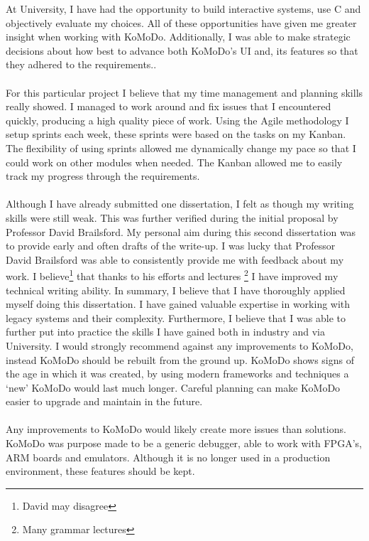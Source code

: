 %
At University, I have had the opportunity to build interactive systems, use C and objectively evaluate my choices. All of these opportunities have given me greater insight when working with KoMoDo. Additionally, I was able to make strategic decisions about how best to advance both KoMoDo's UI and, its features so that they adhered to the requirements..\\\\
%
For this particular project I believe that my time management and planning skills really showed. I managed to work around and fix issues that I encountered quickly, producing a high quality piece of work. Using the Agile methodology I setup sprints each week, these sprints were based on the tasks on my Kanban. The flexibility of using sprints allowed me dynamically change my pace so that I could work on other modules when needed. The Kanban allowed me to easily track my progress through the requirements.\\\\
%
Although I have already submitted one dissertation, I felt as though my writing skills were still weak. This was further verified during the initial proposal by Professor David Brailsford. My personal aim during this second dissertation was to provide early and often drafts of the write-up. I was lucky that Professor David Brailsford was able to consistently provide me with feedback about my work. I believe\footnote{David may disagree} that thanks to his efforts and lectures \footnote{Many grammar lectures} I have improved my technical writing ability.
%
In summary, I believe that I have thoroughly applied myself doing this dissertation. I have gained valuable expertise in working with legacy systems and their complexity. Furthermore, I believe that I was able to further put into practice the skills I have gained both in industry and via University.
%
%
%
I would strongly recommend against any improvements to KoMoDo, instead KoMoDo should be rebuilt from the ground up. KoMoDo shows signs of the age in which it was created, by using modern frameworks and techniques a `new' KoMoDo would last much longer. Careful planning can make KoMoDo easier to upgrade and maintain in the future.\\\\
%
Any improvements to KoMoDo would likely create more issues than solutions. KoMoDo was purpose made to be a generic debugger, able to work with FPGA's, ARM boards and emulators. Although it is no longer used in a production environment, these features should be kept.
